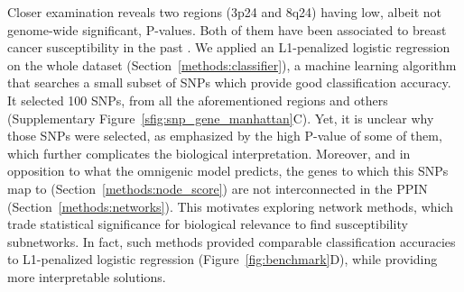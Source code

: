 \documentclass[twocolumn, 11pt]{article}
\begin{document}
Closer examination reveals two regions (3p24 and 8q24) having low, albeit not genome-wide significant, P-values. Both of them have been associated to breast cancer susceptibility in the past \cite{brisbin_meta-analysis_2011,search_newly_2009}. We applied an L1-penalized logistic regression on the whole dataset (Section~\ref{methods:classifier}), a machine learning algorithm that searches a small subset of SNPs which provide good classification accuracy. It selected 100 SNPs, from all the aforementioned regions and others (Supplementary Figure~\ref{sfig:snp_gene_manhattan}C). Yet, it is unclear why those SNPs were selected, as emphasized by the high P-value of some of them, which further complicates the biological interpretation. Moreover, and in opposition to what the omnigenic model predicts, the genes to which this SNPs map to (Section~\ref{methods:node_score}) are not interconnected in the PPIN (Section~\ref{methods:networks}). This motivates exploring network methods, which trade statistical significance for biological relevance to find susceptibility subnetworks. In fact, such methods provided comparable classification accuracies to L1-penalized logistic regression (Figure~\ref{fig:benchmark}D), while providing more interpretable solutions. 
\end{document}
